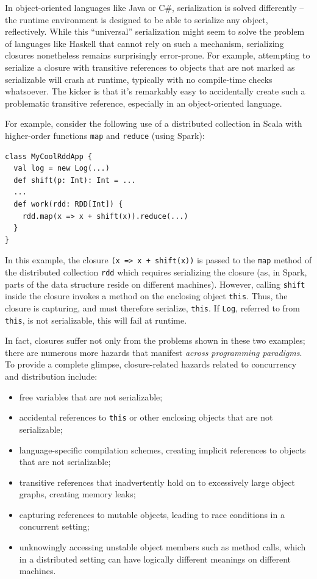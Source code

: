 \documentclass{llncs}
\begin{document}
In object-oriented languages like Java or C\#, serialization is solved
differently -- the runtime environment is designed to be able to serialize any
object, reflectively. While this ``universal'' serialization might seem to
solve the problem of languages like Haskell that cannot rely on such a
mechanism, serializing closures nonetheless remains surprisingly error-prone.
For example, attempting to serialize a closure with transitive references to
objects that are not marked as serializable will crash at runtime, typically
with no compile-time checks whatsoever. The kicker is that it's remarkably
easy to accidentally create such a problematic transitive reference,
especially in an object-oriented language.

For example, consider the following use of a distributed collection in Scala
with higher-order functions \verb|map| and \verb|reduce| (using Spark):

\begin{lstlisting}
class MyCoolRddApp {
  val log = new Log(...)
  def shift(p: Int): Int = ...
  ...
  def work(rdd: RDD[Int]) {
    rdd.map(x => x + shift(x)).reduce(...)
  }
}
\end{lstlisting}

In this example, the closure \verb|(x => x + shift(x))| is passed to the
\verb|map| method of the distributed collection \verb|rdd| which requires
serializing the closure (as, in Spark, parts of the data structure reside on
different machines). However, calling \verb|shift| inside the closure invokes
a method on the enclosing object \verb|this|. Thus, the closure is capturing,
and must therefore serialize, \verb|this|. If \verb|Log|, referred to from
\verb|this|, is not serializable, this will fail at runtime.

In fact, closures suffer not only from the problems shown in these two
examples; there are numerous more hazards that manifest {\em across
programming paradigms}. To provide a complete glimpse, closure-related hazards
related to concurrency and distribution include:


\vspace{-2mm}
\begin{itemize}
\item free variables that are not serializable;
\item accidental references to \verb|this| or other enclosing objects that are not serializable;
\item language-specific compilation schemes, creating implicit references to objects that are not serializable;
\item transitive references that inadvertently hold on to excessively large object graphs, creating memory leaks;
\item capturing references to mutable objects, leading to race conditions in a concurrent setting;
\item unknowingly accessing unstable object members such as method calls, which in a distributed setting can have logically different meanings on different machines.
\end{itemize}
\end{document}
